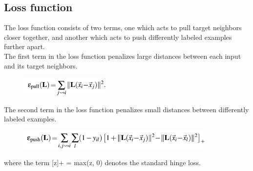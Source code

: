 \documentclass{article}
\begin{document}
\subsection{Loss function}
The loss function consists of two terms, one which acts to pull target neighbors closer together, and another which acts to push differently labeled examples further apart.\\
The first term in the loss function penalizes large distances between each input and its target
neighbors.
\begin{figure}[H]
    \centering
    \includegraphics[height=1cm]{./lmnn_eq2.png}
\end{figure}

The second term in the loss function penalizes small distances between differently labeled examples.
\begin{figure}[H]
    \centering
    \includegraphics[height=1cm]{./lmnn_eq3.png}
\end{figure}
where the term [z]+ = max(z, 0) denotes the standard hinge loss.
\end{document}
